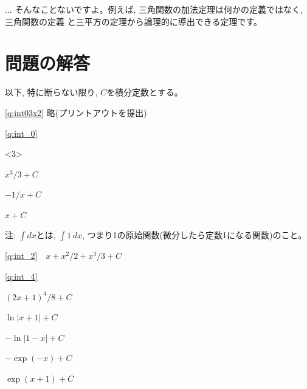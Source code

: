 \begin{faq}{\small{}
... そんなことないですよ。例えば, 三角関数の加法定理は何かの定義ではなく, 三角関数の定義
と三平方の定理から論理的に導出できる定理です。}\end{faq}
\hv




\section*{問題の解答}

以下, 特に断らない限り, $C$を積分定数とする。\hv


\ref{q:int03x2} 略(プリントアウトを提出)\mv



\ref{q:int_0}  
\begin{edaenumerate}<3>
\item %
$x^3/3+C$
\item %
$-1/x+C$
\item %
$x+C$
\end{edaenumerate}
注: $\int dx$とは, $\int 1\,dx$, つまり1の原始関数(微分したら定数1になる関数)のこと。
\mv

\ref{q:int_2} $\,\,\,\,x+x^2/2+x^3/3+C$
\mv

\ref{q:int_4}  
\begin{edaenumerate}
\item $(2x+1)^4/8+C$
\item $\ln |x+1|+C$
\item $-\ln |1-x|+C$
\item $-\exp (-x)+C$
\item $\exp (x+1)+C$
\end{edaenumerate}
\mv


